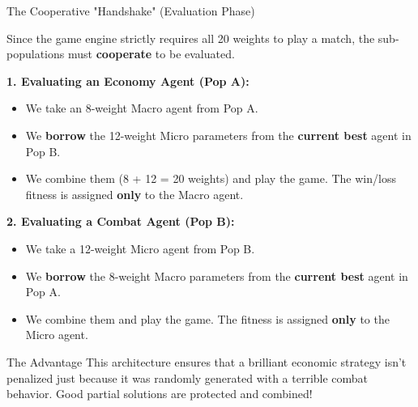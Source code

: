 \documentclass[aspectratio=169, 10pt]{beamer}
\begin{document}
\begin{frame}{The Cooperative "Handshake" (Evaluation Phase)}

Since the game engine strictly requires all 20 weights to play a match, the sub-populations must \textbf{cooperate} to be evaluated.

\vspace{0.4cm}

\textbf{\textcolor{macroBlue}{1. Evaluating an Economy Agent (Pop A):}}
\begin{itemize}
    \item We take an 8-weight Macro agent from Pop A.
    \item We \textbf{borrow} the 12-weight Micro parameters from the \textbf{current best} agent in Pop B.
    \item We combine them (8 + 12 = 20 weights) and play the game. The win/loss fitness is assigned \textbf{only} to the Macro agent.
\end{itemize}

\vspace{0.2cm}
\textbf{\textcolor{microOrange}{2. Evaluating a Combat Agent (Pop B):}}
\begin{itemize}
    \item We take a 12-weight Micro agent from Pop B.
    \item We \textbf{borrow} the 8-weight Macro parameters from the \textbf{current best} agent in Pop A.
    \item We combine them and play the game. The fitness is assigned \textbf{only} to the Micro agent.
\end{itemize}

\vspace{0.3cm}
\begin{alertblock}{The Advantage}
This architecture ensures that a brilliant economic strategy isn't penalized just because it was randomly generated with a terrible combat behavior. Good partial solutions are protected and combined!
\end{alertblock}

\end{frame}
\end{document}
